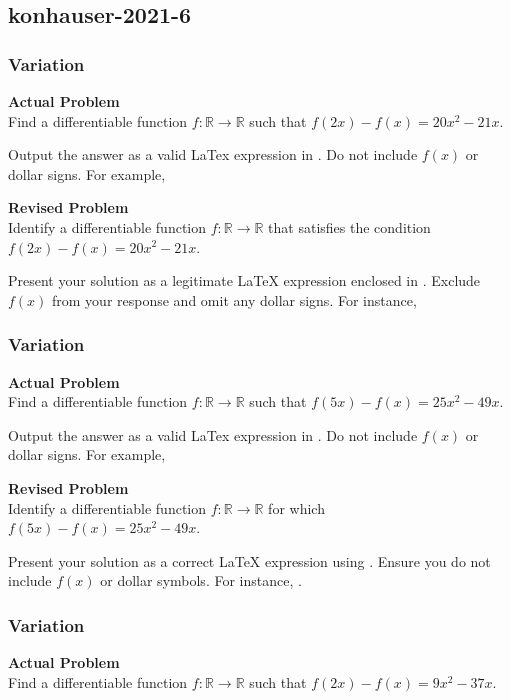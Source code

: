 \subsection{konhauser-2021-6}
\subsubsection{Variation}
\textbf{Actual Problem}\\
Find a differentiable function $f \colon \mathbb{R} \to \mathbb{R}$ such that $f(2x) - f(x) = 20x^2 - 21x$.

Output the answer as a valid LaTex expression in . Do not include $f(x)$ or dollar signs. For example, 

\textbf{Revised Problem}\\
Identify a differentiable function \( f: \mathbb{R} \rightarrow \mathbb{R} \) that satisfies the condition \( f(2x) - f(x) = 20x^2 - 21x \).

Present your solution as a legitimate LaTeX expression enclosed in . Exclude \( f(x) \) from your response and omit any dollar signs. For instance, 

\subsubsection{Variation}
\textbf{Actual Problem}\\
Find a differentiable function $f \colon \mathbb{R} \to \mathbb{R}$ such that $f(5x) - f(x) = 25x^2 - 49x$.

Output the answer as a valid LaTex expression in . Do not include $f(x)$ or dollar signs. For example, 

\textbf{Revised Problem}\\
Identify a differentiable function \( f \colon \mathbb{R} \to \mathbb{R} \) for which \( f(5x) - f(x) = 25x^2 - 49x \).

Present your solution as a correct LaTeX expression using . Ensure you do not include \( f(x) \) or dollar symbols. For instance, .

\subsubsection{Variation}
\textbf{Actual Problem}\\
Find a differentiable function $f \colon \mathbb{R} \to \mathbb{R}$ such that $f(2x) - f(x) = 9x^2 - 37x$.

